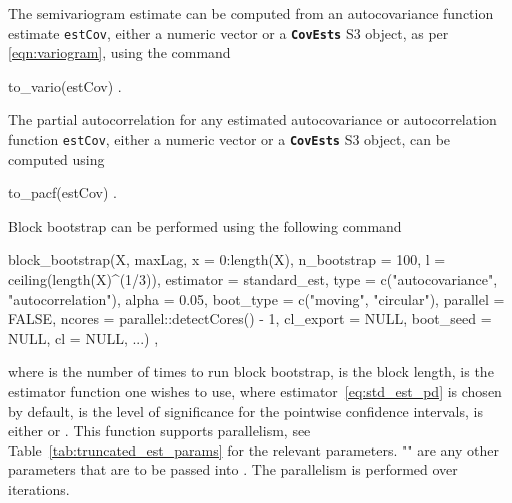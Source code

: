 The semivariogram estimate can be computed from an autocovariance function estimate \texttt{estCov}, either a numeric vector or a \textbf{\texttt{CovEsts}} S3 object, as per \eqref{eqn:variogram}, using the command 
\begin{example}
to_vario(estCov) .
\end{example}

The partial autocorrelation for any estimated autocovariance or autocorrelation function \texttt{estCov}, either a numeric vector or a \textbf{\texttt{CovEsts}} S3 object, can be computed using
\begin{example}
to_pacf(estCov) .
\end{example}

Block bootstrap can be performed using the following command
\begin{example}
block_bootstrap(X, maxLag, x = 0:length(X), n_bootstrap = 100,
        l = ceiling(length(X)^(1/3)), estimator = standard_est,
        type = c("autocovariance", "autocorrelation"), alpha = 0.05,
        boot_type = c("moving", "circular"), parallel = FALSE,
        ncores = parallel::detectCores() - 1, cl_export = NULL,
        boot_seed = NULL, cl = NULL, ...) ,
\end{example}
where  is the number of times to run block bootstrap,  is the block length,  is the estimator function one wishes to use, where estimator~\eqref{eq:std_est_pd} is chosen by default,  is the level of significance for the pointwise confidence intervals,  is either  or . This function supports parallelism, see Table~\ref{tab:truncated_est_params} for the relevant parameters. "" are any other parameters that are to be passed into . The parallelism is performed over  iterations.

